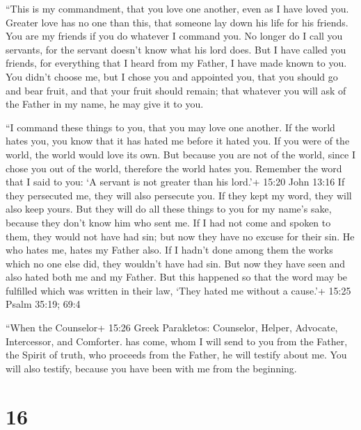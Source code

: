  ``This is my commandment, that you love one another, even
as I have loved you.  Greater love has no one than this,
that someone lay down his life for his friends.  You are my
friends if you do whatever I command you.  No longer do I
call you servants, for the servant doesn't know what his lord does. But
I have called you friends, for everything that I heard from my Father, I
have made known to you.  You didn't choose me, but I chose
you and appointed you, that you should go and bear fruit, and that your
fruit should remain; that whatever you will ask of the Father in my
name, he may give it to you.

 ``I command these things to you, that you may love one
another.  If the world hates you, you know that it has
hated me before it hated you.  If you were of the world,
the world would love its own. But because you are not of the world,
since I chose you out of the world, therefore the world hates you.
 Remember the word that I said to you: `A servant is not
greater than his lord.'+ 15:20 John 13:16 If they persecuted me, they
will also persecute you. If they kept my word, they will also keep
yours.  But they will do all these things to you for my
name's sake, because they don't know him who sent me.  If I
had not come and spoken to them, they would not have had sin; but now
they have no excuse for their sin.  He who hates me, hates
my Father also.  If I hadn't done among them the works
which no one else did, they wouldn't have had sin. But now they have
seen and also hated both me and my Father.  But this
happened so that the word may be fulfilled which was written in their
law, `They hated me without a cause.'+ 15:25 Psalm 35:19; 69:4

 ``When the Counselor+ 15:26 Greek Parakletos: Counselor,
Helper, Advocate, Intercessor, and Comforter. has come, whom I will send
to you from the Father, the Spirit of truth, who proceeds from the
Father, he will testify about me.  You will also testify,
because you have been with me from the beginning.

\hypertarget{section-15}{%
\section{16}\label{section-15}}

